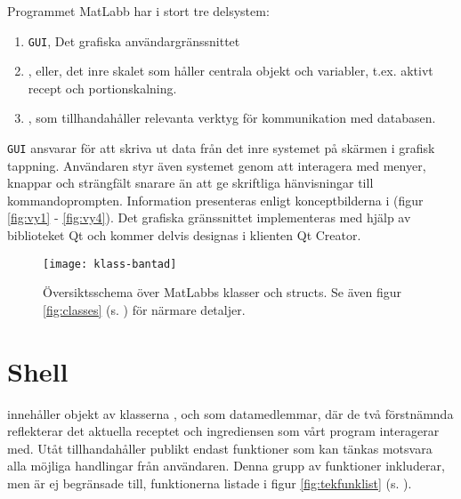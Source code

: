 Programmet MatLabb har i stort tre delsystem:

\begin{enumerate}
\item \verb+GUI+, Det grafiska användargränssnittet
\item \Shell, eller, det inre skalet som håller centrala objekt och variabler, t.ex. aktivt recept och portionskalning.
\item \Lookup, som tillhandahåller relevanta verktyg för kommunikation med databasen.
\end{enumerate}
\verb+GUI+ ansvarar för att skriva ut data från det inre systemet på skärmen i grafisk tappning. Användaren styr även systemet genom att interagera med menyer, knappar och strängfält snarare än att ge skriftliga hänvisningar till kommandoprompten. Information presenteras enligt konceptbilderna i (figur \ref{fig:vy1} - \ref{fig:vy4}). Det grafiska gränssnittet implementeras med hjälp av biblioteket Qt och kommer delvis designas i klienten Qt Creator.

\begin{figure}[h]
  \centering
  \texttt{[image: klass-bantad]}
  \caption{Översiktsschema över MatLabbs klasser och structs. Se även figur \ref{fig:classes} (s. \pageref{fig:classes}) för närmare detaljer.}
  \label{fig:redklass}
\end{figure}

\section{Shell}
\Shell{} innehåller objekt av klasserna \Recipe{}, \InfoIngredient{} och \Lookup{} som datamedlemmar, där de två förstnämnda reflekterar det aktuella receptet och ingrediensen som vårt program interagerar med. Utåt tillhandahåller \Shell publikt endast funktioner som kan tänkas motsvara alla möjliga handlingar från användaren. Denna grupp av funktioner inkluderar, men är ej begränsade till, funktionerna listade i figur \ref{fig:tekfunklist} (s. \pageref{fig:tekfunklist}).

